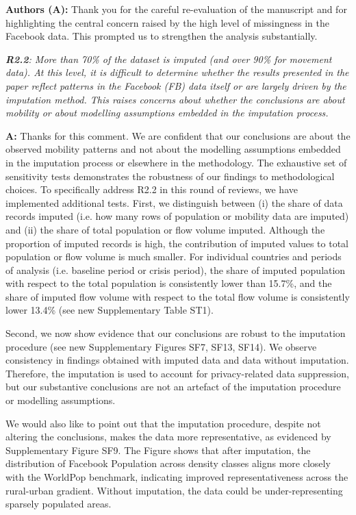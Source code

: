 \documentclass[12pt,a4paper,oneside, reqno]{amsart}
\begin{document}
\setlength{\leftskip}{1cm}\textbf{Authors (A):} Thank you for the careful re-evaluation of the manuscript and for highlighting the central concern raised by the high level of missingness in the Facebook data. This prompted us to strengthen the analysis substantially. 

\setlength{\leftskip}{0cm} \textit{\textbf{R2.2}: More than 70\% of the dataset is imputed (and over 90\% for movement data). At this level, it is difficult to determine whether the results presented in the paper reflect patterns in the Facebook (FB) data itself or are largely driven by the imputation method. This raises concerns about whether the conclusions are about mobility or about modelling assumptions embedded in the imputation process.}

\setlength{\leftskip}{1cm}\textbf{A:} Thanks for this comment. We are confident that our conclusions are about the observed mobility patterns and not about the modelling assumptions embedded in the imputation process or elsewhere in the methodology. The exhaustive set of sensitivity tests demonstrates the robustness of our findings to methodological choices. To specifically address R2.2 in this round of reviews, we have implemented additional tests. First, we distinguish between (i) the share of data records imputed (i.e. how many rows of population or mobility data are imputed) and (ii) the share of total population or flow volume imputed. Although the proportion of imputed records is high, the contribution of imputed values to total population or flow volume is much smaller. For individual countries and periods of analysis (i.e. baseline period or crisis period), the share of imputed population with respect to the total population is consistently lower than 15.7\%, and the share of imputed flow volume with respect to the total flow volume is consistently lower 13.4\% (see new Supplementary Table ST1).

Second, we now show evidence that our conclusions are robust to the imputation procedure (see new Supplementary Figures SF7, SF13, SF14). We observe consistency in findings obtained with imputed data and data without imputation. Therefore, the imputation is used to account for privacy-related data suppression, but our substantive conclusions are not an artefact of the imputation procedure or modelling assumptions.

We would also like to point out that the imputation procedure, despite not altering the conclusions, makes the data more representative, as evidenced by Supplementary Figure SF9. The Figure shows that after imputation, the distribution of Facebook Population across density classes aligns more closely with the WorldPop benchmark, indicating improved representativeness across the rural-urban gradient. Without imputation, the data could be under-representing sparsely populated areas.
\end{document}

